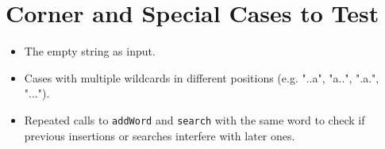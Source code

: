 \section*{Corner and Special Cases to Test}
\begin{itemize}
    \item The empty string as input.
    \item Cases with multiple wildcards in different positions (e.g. "..a", "a..", ".a.", "...").
    \item Repeated calls to \texttt{addWord} and \texttt{search} with the same word to check if previous insertions or searches interfere with later ones.
\end{itemize}
